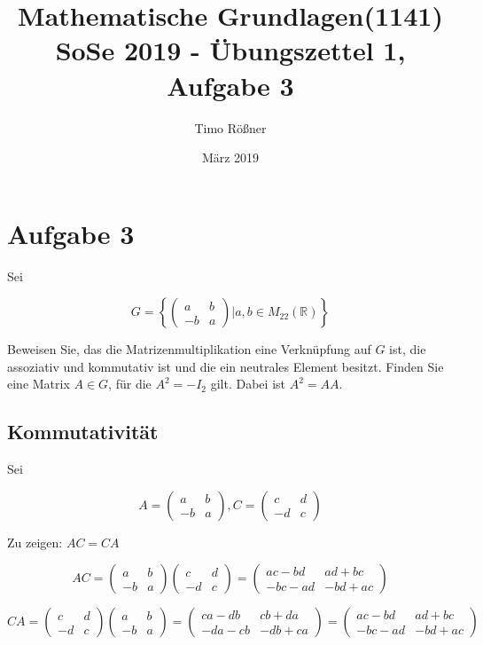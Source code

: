\documentclass{article}
\title{Mathematische Grundlagen(1141) SoSe 2019 - Übungszettel 1, Aufgabe 3}
\author{Timo Rößner }
\date{März 2019}
\begin{document}
\maketitle

\section*{Aufgabe 3}

Sei

\[
G=
\left\{
  \begin{pmatrix}
    a & b \\
    -b & a
  \end{pmatrix}
| a,b \in M_{22}(\mathbb{R})
\right\}
\]

Beweisen Sie, das die Matrizenmultiplikation eine Verknüpfung auf \(G\) ist, die assoziativ und kommutativ ist und die ein neutrales Element
besitzt. Finden Sie eine Matrix \(A \in G\), für die \(A^2=-I_{2}\) gilt. Dabei ist \(A^2=AA\).

\subsection*{Kommutativität}

Sei

\[
A =
    \begin{pmatrix}
      a & b \\
      -b & a
    \end{pmatrix}
,
C =
    \begin{pmatrix}
      c & d \\
      -d & c
    \end{pmatrix}
\]

Zu zeigen: \(AC=CA\)

\[
AC=
  \begin{pmatrix}
    a & b \\
    -b & a
  \end{pmatrix}
  \begin{pmatrix}
    c & d \\
    -d & c
  \end{pmatrix}
  =
  \begin{pmatrix}
    ac-bd    & ad + bc \\
    -bc - ad & -bd + ac
  \end{pmatrix}
\]

\[
CA=
  \begin{pmatrix}
    c & d \\
    -d & c
  \end{pmatrix}
  \begin{pmatrix}
    a & b \\
    -b & a
  \end{pmatrix}
  =
  \begin{pmatrix}
    ca - db  & cb + da \\
    -da - cb & -db + ca
  \end{pmatrix}
  =
  \begin{pmatrix}
    ac - bd  & ad + bc \\
    -bc -ad  & -bd + ac
  \end{pmatrix}
\]
\end{document}
